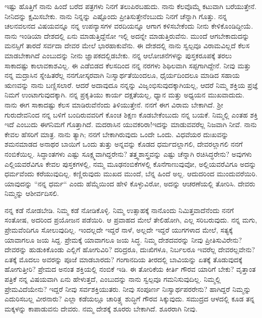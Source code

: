 ಇಷ್ಟು ಹೊತ್ತಿಗೆ ನಾನು ಹಿಂದೆ ಬರೆದ ಪತ್ರಗಳು ನಿನಗೆ ತಲುಪಿರಬಹುದು. ನಾನು ಕೆಲವೊಮ್ಮೆ ಕಟುವಾಗಿ ಬರೆಯುತ್ತೇನೆ. ನೀನಿದನ್ನು ಕ್ಷಮಿಸಬೇಕು. ನಾನು ನಿನ್ನನ್ನು ಎಷ್ಟೊಂದು ಪ್ರೀತಿಸುತ್ತೇನೆಂಬುದು ನಿನಗೆ ಚೆನ್ನಾಗಿ ಗೊತ್ತು. ನನ್ನ ಚಲನವಲನದ ವಿಷಯವನ್ನೂ ನನ್ನ ಉಪನ್ಯಾಸಗಳ ವರದಿಯನ್ನೂ ಆಗಾಗ ಕಳಿಸಬೇಕೆಂದು ನೀನು ಕೇಳಿಕೊಂಡಿದ್ದೀಯೆ. ನಾನು ಇಂಡಿಯಾ ದೇಶದಲ್ಲಿ ಏನು ಮಾಡುತ್ತಿದ್ದೆನೋ ಇಲ್ಲಿ ಅದನ್ನೇ ಮಾಡುತ್ತಿರುವೆನು. ಮುಂದೆ ಆಗಬೇಕಾದುದನ್ನು ಮನಸ್ಸಿಗೆ ತಾರದೆ ಸರ್ವದಾ ದೇವರ ಮೇಲೆ ಭಾರಹಾಕುವೆನು. ಈ ದೇಶದಲ್ಲಿ ನಾನು ಸ್ವಲ್ಪವೂ ವಿರಾಮವಿಲ್ಲದೆ ಕೆಲಸ ಮಾಡಬೇಕಾಗಿದೆ ಎಂಬುದನ್ನು ನೀನು ಜ್ಞಾಪಕದಲ್ಲಿಡಬೇಕು. ನನ್ನ ಆಲೋಚನೆಗಳನ್ನು ಪುಸ್ತಕರೂಪಕ್ಕೆ ತರಲು ಸಾಕಾದಷ್ಟು ಕಾಲಾವಕಾಶವಿಲ್ಲ. ಈ ಎಡೆಬಿಡದ ಕೆಲಸದಿಂದ ನನ್ನ ನರಗಳು ಶಿಥಿಲವಾಗಿ ಸಪ್ಪಗಾಗಿದ್ದೇನೆ. ನೀವು ಮತ್ತು ನನ್ನ ಮದ್ರಾಸಿನ ಸ್ನೇಹಿತರೆಲ್ಲ ನನಗೋಸ್ಕರವಾಗಿ ನಿಃಸ್ವಾರ್ಥತೆಯಿಂದಲೂ, ಧೈರ್ಯದಿಂದಲೂ ಮಾಡಿದ ಸಹಾಯ ಋಣವನ್ನು ನಾನು ಬಣ್ಣಿಸಲಾರೆ. ಆದರೆ ಅದಾವುದೂ ನನ್ನನ್ನು ವಿಜೃಂಭಿಸುವುದಕ್ಕಾಗಿಯಲ್ಲ, ಆದರೆ ನಿಮ್ಮ ಶಕ್ತಿಯ ಪ್ರಜ್ಞೆ ನಿಮಗೆ ಉಂಟಾಗುವುದಕ್ಕಾಗಿ. ನನ್ನ ಪ್ರಕೃತಿಯು ಕಾರ್ಯ ದಕ್ಷತೆಯಲ್ಲ, ಧ್ಯಾನ ಮತ್ತು ಅಧ್ಯಯನ ಮುಖವಾದುದು. ನಾನು ಈಗ ಸಾಕಾದಷ್ಟು ಕೆಲಸ ಮಾಡಿರುವೆನೆಂದು ತಿಳಿಯುತ್ತೇನೆ. ನನಗೆ ಈಗ ವಿರಾಮ ಬೇಕಾಗಿದೆ. ಶ‍್ರೀ ಗುರುದೇವನಿಂದ ನನ್ನ ಬಳಿಗೆ ಬಂದಿರುವವರಿಗೆ ಕೊಂಚ ಶಿಕ್ಷಣ ಕೊಡಬೇಕೆಂಬುದು ನನ್ನ ಬಯಕೆ. ನಿಮ್ಮಲ್ಲಿ ಎಂತಹ ಶಕ್ತಿ ಇದೆ ಎಂಬುದು ಈಗನಿಮಗೆ ಗೊತ್ತಾಗಿದೆ. ಮದರಾಸಿನ ಯುವಕರಿರಾ!ಇದನ್ನು ಮಾಡುವವರೆಲ್ಲ ನಿಜವಾಗಿ ನೀವೆ. ನಾನು ಕೇವಲ ಹೆಸರಿಗೆ ಮಾತ್ರ. ನಾನು ತ್ಯಾಗಿ; ನನಗೆ ಬೇಕಾಗಿರುವುದು ಒಂದೇ ಒಂದು. ವಿಧವೆಯರ ದುಃಖವನ್ನು ಶಮನಮಾಡದ ಅನಾಥರ ಬಾಯಿಗೆ ಒಂದು ತುತ್ತು ಅನ್ನವನ್ನು ಕೊಡದ ಧರ್ಮದಲ್ಲಾಗಲಿ, ದೇವರಲ್ಲಾಗಲಿ ನನಗೆ ನಂಬಿಕೆಯಿಲ್ಲ. ಸಿದ್ಧಾಂತಗಳು ಎಷ್ಟು ಸೂಕ್ಷ್ಮವಾಗಿದ್ದರೇನು? ತತ್ತ್ವಶಾಸ್ತ್ರವನ್ನು ಎಷ್ಟು ಚೆನ್ನಾಗಿ ರಚಿಸಿದ್ಧರೇನು? ಅವುಗಳು ಎಲ್ಲಿಯವರೆವಿಗೂ ಕೇವಲ ಪುಸ್ತಕಗಳಲ್ಲಿ, ನಮ್ಮ ಮೂಢನಂಬಿಕೆಗಳಲ್ಲಿ ಕೊನೆಗಾಣುವುವೋ, ಅಲ್ಲಿಯವರೆವಿಗೂ ಅದನ್ನು ಧರ್ಮವೆಂದು ಕರೆಯುವುದಿಲ್ಲ. ಕಣ್ಣಿರುವುದು ಮುಖದ ಮುಂದೆ, ಬೆನ್ನ ಹಿಂದೆ ಅಲ್ಲ. ಆದುದರಿಂದ ಮುಂದುವರೆಯಿರಿ. ಯಾವುದನ್ನು “ನನ್ನ ಧರ್ಮ“ ಎಂದು ಹೆಮ್ಮೆಯಿಂದ ಹೇಳಿ ಕೊಳ್ಳುವಿರೋ, ಅದನ್ನು ಆಚರಣೆಯಲ್ಲಿ ತೋರಿಸಿ. ದೇವರು ನಿಮ್ಮನ್ನು ಆಶೀರ್ವದಿಸಲಿ.

ನನ್ನ ಕಡೆ ನೋಡಬೇಡಿ. ನಿಮ್ಮ ಕಡೆ ನೋಡಿಕೊಳ್ಳಿ. ನಿಮ್ಮ ಉತ್ಸಾಹಕ್ಕೆ ನಾನೊಂದು ನಿಮಿತ್ತವಾದೆನೆಂದು ನನಗೆ ಸಂತೋಷ, ಅದರಿಂದ ಪ್ರಯೋಜನ ಪಡೆಯಿರಿ. ಆ ಪ್ರವಾಹದ ಮೇಲೆ ತೇಲಿಹೋಗಿ, ಎಲ್ಲ ಸರಿಬರುವುದು. ನನ್ನ ಮಗು, ಪ್ರೇಮವೆಂದಿಗೂ ಸೋಲುವುದಿಲ್ಲ. ಇಂದಲ್ಲದೇ ಇದ್ದರೆ ನಾಳೆ, ಅಲ್ಲದೇ ಇದ್ದರೆ ಯುಗಗಳಾದ ಮೇಲೆ, ಸತ್ಯಕ್ಕೆ ಯಾವಾಗಲೂ ಜಯ ಸಿದ್ದ. ಪ್ರೇಮಕ್ಕೆ ಯಾವಾಗಲೂ ಜಯ ಸಿದ್ಧ. ನಿಮ್ಮ ದೇಶದವರನ್ನು ನೀವು ಪ್ರೀತಿಸುವಿರೇನು? ದೇವರನ್ನು ಹುಡುಕಿಕೊಂಡು ಎಲ್ಲಿಗೆ ಹೋಗುವಿರಿ? ದರಿದ್ರರೂ, ದುಃಖಿಗಳೂ, ನಿರ್ಬಲರೂ ಇವರೆಲ್ಲ ದೇವರಲ್ಲವೇನು? ಏತಕ್ಕೆ ಮೊದಲು ಅವರನ್ನು ಪೂಜೆ ಮಾಡಬಾರದು? ಗಂಗಾನದಿಯ ತೀರದಲ್ಲಿ ಬಾವಿಯನ್ನು ಏತಕ್ಕೆ ತೊಡುವುದಕ್ಕೆ ಹೋಗುತ್ತೀರಿ? ಪ್ರೇಮದ ಅನಂತ ಶಕ್ತಿಯಲ್ಲಿ ನಂಬಿಕೆ ಇಡಿ. ಈ ತೋರಿಕೆಯ ಕೀರ್ತಿ ಗೌರವ ಯಾರಿಗೆ ಬೇಕು? ವೃತ್ತಾಂತ ಪತ್ರಿಕೆ ನನ್ನ ವಿಷಯವಾಗಿ ಏನು ಹೇಳುತ್ತದೆ, ಎಂಬುದನ್ನು ನಾನು ಸ್ವಲ್ಪವೂ ಗಮನಿಸುವುದಿಲ್ಲ. ನಿಮ್ಮಲ್ಲಿ ಪ್ರೇಮವಿದೆಯೇನು? ಇದ್ದರೆ ನೀವು ಸರ್ವಶಕ್ತಿಯುತರು. ನೀವು ಸಂಪೂರ್ಣ ನಿಃಸ್ವಾರ್ಥಪರರೇನು? ಹಾಗಿದ್ದರೆ ನಿಮ್ಮನ್ನು ಎದುರಿಸಬಲ್ಲ ವೀರನಾರು? ಎಲ್ಲಾ ಕಡೆಯಲ್ಲೂ ಚಾರಿತ್ರ್ಯ ಶುದ್ಧಿಗೆ ಗೌರವ ಸಿಕ್ಕುವುದು. ಸಮುದ್ರದ ಆಳದಲ್ಲಿ ಕೂಡ ತನ್ನ ಮಕ್ಕಳನ್ನು ಕಾಪಾಡುವನು ದೇವರು. ನಮ್ಮ ದೇಶಕ್ಕೆ ಶೂರರು ಬೇಕಾಗಿದೆ. ಶೂರರಾಗಿ ನೀವು.

